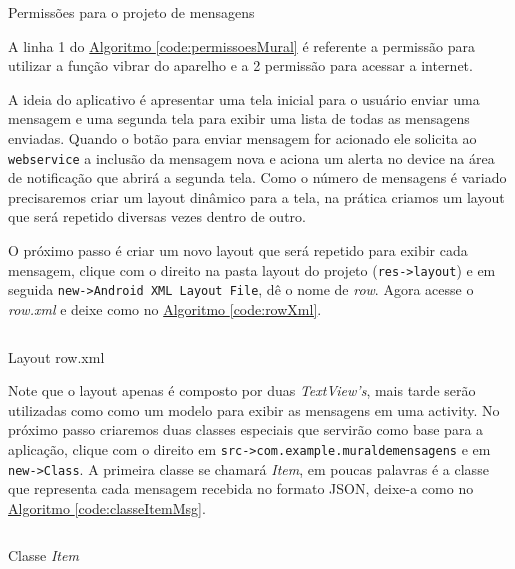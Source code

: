 \documentclass[a4paper,12pt,brazil,oneside]{book}
\begin{document}
\begin{listing}[H]
	\inputminted[linenos=true,fontsize=\small,frame=lines, framesep=2mm, tabsize=2,numbersep=5pt]{xml}{src/devapp/muraldemensagens/permissoes.java}
	\caption{Permissões para o projeto de mensagens}
	\label{code:permissoesMural}
	\end{listing}
	
A linha 1 do \hyperref[code:permissoesMural]{Algoritmo \ref*{code:permissoesMural}} é referente a permissão para utilizar a função vibrar do aparelho e a 2 permissão para acessar a internet.

A ideia do aplicativo é apresentar uma tela inicial para o usuário enviar uma mensagem e uma segunda tela para exibir uma lista de todas as mensagens enviadas. Quando o botão para enviar mensagem for acionado ele solicita ao \texttt{webservice} a inclusão da mensagem nova e aciona um alerta no device na área de notificação que abrirá a segunda tela. Como o número de mensagens é variado precisaremos criar um layout dinâmico para a tela, na prática criamos um layout que será repetido diversas vezes dentro de outro.

O próximo passo é criar um novo layout que será repetido para exibir cada mensagem, clique com o direito na pasta layout do projeto (\texttt{res->layout}) e em seguida \texttt{new->Android XML Layout File}, dê o nome de \emph{row}. Agora acesse o \emph{row.xml} e deixe como no \hyperref[code:rowXml]{Algoritmo \ref*{code:rowXml}}.

\begin{listing}[H]
	\inputminted[linenos=true,fontsize=\small,frame=lines, framesep=2mm, tabsize=2,numbersep=5pt]{xml}{src/devapp/muraldemensagens/row.xml}
	\caption{Layout row.xml}
	\label{code:rowXml}
	\end{listing}
	
Note que o layout apenas é composto por duas \emph{TextView's}, mais tarde serão utilizadas como como um modelo para exibir as mensagens em uma activity. No próximo passo criaremos duas classes especiais que servirão como base para a aplicação, clique com o direito em \texttt{src->com.example.muraldemensagens} e em \texttt{new->Class}.
A primeira classe se chamará \emph{Item}, em poucas palavras é a classe que representa cada mensagem recebida no formato JSON, deixe-a como no \hyperref[code:classeItemMsg]{Algoritmo \ref*{code:classeItemMsg}}.

\begin{listing}[H]
	\inputminted[linenos=true,fontsize=\small,frame=lines, framesep=2mm, tabsize=2,numbersep=5pt]{xml}{src/devapp/muraldemensagens/Item.java}
	\caption{Classe \emph{Item}}
	\label{code:classeItemMsg}
	\end{listing}
	
\end{document}
